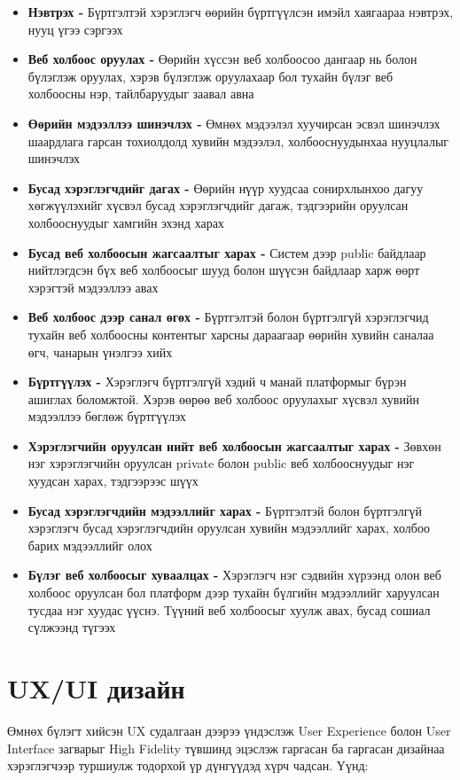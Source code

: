 \begin{itemize}
	\item \textbf{Нэвтрэх -} Бүртгэлтэй хэрэглэгч өөрийн бүртгүүлсэн имэйл хаягаараа нэвтрэх, нууц үгээ сэргээх
	\item \textbf{Веб холбоос оруулах -} Өөрийн хүссэн веб холбоосоо дангаар нь болон бүлэглэж оруулах, хэрэв бүлэглэж оруулахаар бол тухайн бүлэг веб холбоосны нэр, тайлбаруудыг заавал авна
	\item \textbf{Өөрийн мэдээллээ шинэчлэх -} Өмнөх мэдээлэл хуучирсан эсвэл шинэчлэх шаардлага гарсан тохиолдолд хувийн мэдээлэл, холбооснуудынхаа нууцлалыг шинэчлэх
	\item \textbf{Бусад хэрэглэгчдийг дагах -} Өөрийн нүүр хуудсаа сонирхлынхоо дагуу хөгжүүлэхийг хүсвэл бусад хэрэглэгчдийг дагаж, тэдгээрийн оруулсан холбооснуудыг хамгийн эхэнд харах
	\item \textbf{Бусад веб холбоосын жагсаалтыг харах -} Систем дээр public байдлаар нийтлэгдсэн бүх веб холбоосыг шууд болон шүүсэн байдлаар харж өөрт хэрэгтэй мэдээллээ авах
	\item \textbf{Веб холбоос дээр санал өгөх -} Бүртгэлтэй болон бүртгэлгүй хэрэглэгчид тухайн веб холбоосны контентыг харсны дараагаар өөрийн хувийн саналаа өгч, чанарын үнэлгээ хийх 
	\item \textbf{Бүртгүүлэх -} Хэрэглэгч бүртгэлгүй хэдий ч манай платформыг бүрэн ашиглах боломжтой. Хэрэв өөрөө веб холбоос оруулахыг хүсвэл хувийн мэдээллээ бөглөж бүртгүүлэх
	\item \textbf{Хэрэглэгчийн оруулсан нийт веб холбоосын жагсаалтыг харах -} Зөвхөн нэг хэрэглэгчийн оруулсан private болон public веб холбооснуудыг нэг хуудсан харах, тэдгээрээс шүүх
	\item \textbf{Бусад хэрэглэгчдийн мэдээллийг харах -} Бүртгэлтэй болон бүртгэлгүй хэрэглэгч бусад хэрэглэгчдийн оруулсан хувийн мэдээллийг харах, холбоо барих мэдээллийг олох
	\item \textbf{Бүлэг веб холбоосыг хуваалцах -} Хэрэглэгч нэг сэдвийн хүрээнд олон веб холбоос оруулсан бол платформ дээр тухайн бүлгийн мэдээллийг харуулсан тусдаа нэг хуудас үүснэ. Түүний веб холбоосыг хуулж авах, бусад сошиал сүлжээнд түгээх
\end{itemize}

\pagebreak
\section{UX/UI дизайн}

Өмнөх бүлэгт хийсэн UX судалгаан дээрээ үндэслэж User Experience болон User Interface загварыг High Fidelity түвшинд эцэслэж гаргасан ба гаргасан дизайнаа хэрэглэгчээр туршиулж тодорхой үр дүнгүүдэд хүрч чадсан. Үүнд: 

